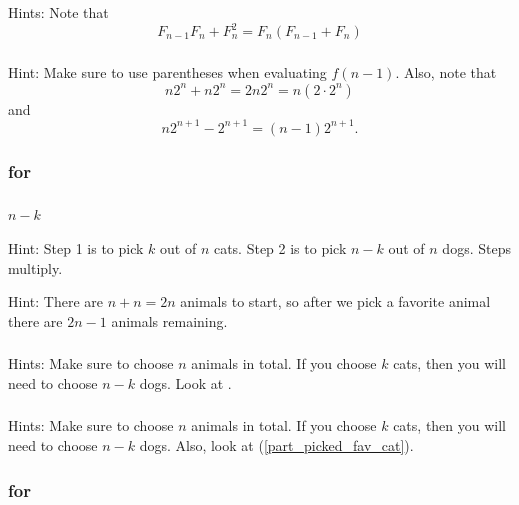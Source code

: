 \subsubsection*{ \answers}
Hints: Note that $$F_{n-1}F_n + F_n^2 = F_n(F_{n-1} + F_n)$$

\subsubsection*{ \answers}
Hint: Make sure to use parentheses when evaluating $f(n-1)$.  Also, note that $$n2^n + n2^n = 2n2^n=n(2\cdot2^n)$$
and $$n2^{n+1}-2^{n+1}=(n-1)2^{n+1}.$$

\subsubsection{\answers for  \subpffcombsums}

\subsubsection*{ \answers}
\begin{apart}
    \item $n-k$
    \item Hint: Step 1 is to pick $k$ out of $n$ cats.  Step 2 is to pick $n-k$ out of $n$ dogs.  Steps multiply.
    \item Hint: There are $n+n=2n$ animals to start, so after we pick a favorite animal there are $2n-1$ animals remaining.
\end{apart}

\subsubsection*{ \answers}
Hints: Make sure to choose $n$ animals in total.  If you choose $k$ cats, then you will need to choose $n-k$ dogs.  Look at .

\subsubsection*{ \answers}
Hints: Make sure to choose $n$ animals in total.  If you choose $k$ cats, then you will need to choose $n-k$ dogs. Also, look at  (\ref{part_picked_fav_cat}).
\subsubsection{\answers for  \subspecialsum}

